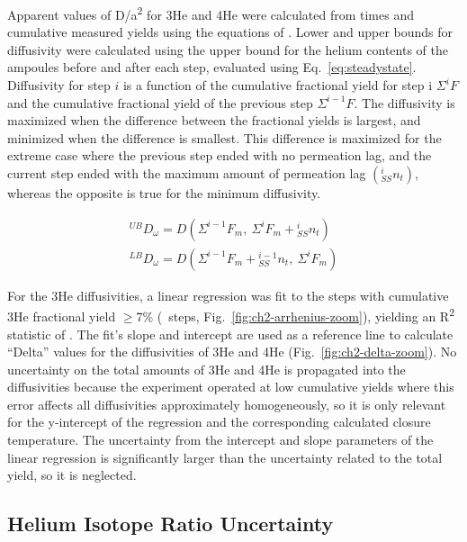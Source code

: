 Apparent values of D/a\textsuperscript{2} for 3He and 4He were
calculated from times and cumulative measured yields using the equations of \citet{fechtigkalbitzer1966}. 
Lower and upper bounds for diffusivity were calculated 
using the upper bound for the helium contents of the 
ampoules before and after each step, evaluated using Eq.~\eqref{eq:steadystate}. 
Diffusivity for step $i$ is a function of the cumulative fractional yield for step i 
$\Sigma ^{i}F$ and the cumulative fractional yield of the previous step $\Sigma ^{i-1}F$. The diffusivity
is maximized when the difference between the fractional yields is largest, and minimized when the difference is smallest. 
This difference is maximized for the extreme case where the previous step ended with no permeation lag, and the current step ended 
with the maximum amount of permeation lag $\left(_{SS}^{i}n_t\right)$, whereas the opposite is true for the minimum diffusivity. 


\begin{equation}
\label{eq:diffusivity-bounds}
\begin{gathered}
{}^{UB}D_\omega = D\!\left(\Sigma^{i-1}F_m ,~ \Sigma^{i}F_m + {}_{SS}^{i}n_t\right) \\
{}^{LB}D_\omega = D\!\left(\Sigma^{i-1}F_m + {}_{SS}^{i-1}n_t ,~ \Sigma^{i}F_m\right)
\end{gathered}
\end{equation}

For the 3He diffusivities, a linear regression was fit to the steps with cumulative 3He fractional
yield $\geq$7\% (\ChTwoN\ steps, Fig.~\ref{fig:ch2-arrhenius-zoom}),
yielding an R\textsuperscript{2} statistic of \ChTwoRtwo. The fit's slope and intercept are used as a reference line to
calculate ``Delta'' values for the diffusivities of 3He and 4He (Fig.~\ref{fig:ch2-delta-zoom}). No uncertainty on
the total amounts of 3He and 4He is propagated into the diffusivities
because the experiment operated at low cumulative yields where this
error affects all diffusivities approximately homogeneously, so it is only
relevant for the y-intercept of the regression and the corresponding
calculated closure temperature. The uncertainty from the
intercept and slope parameters of the linear regression is significantly
larger than the uncertainty related to the total yield, so it is
neglected.

\subsection{Helium Isotope Ratio Uncertainty}\label{helium-isotope-ratio-uncertainty}

